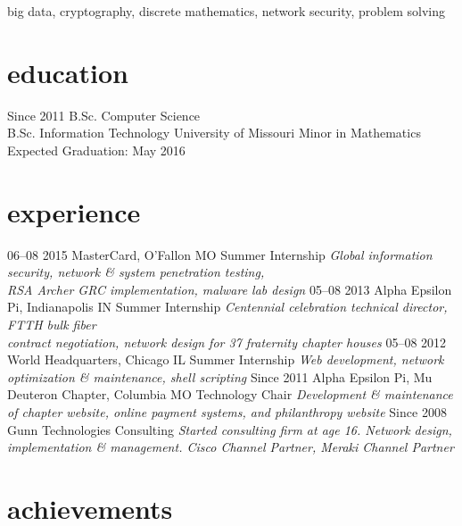 \documentclass[print]{gunn-resume}
\begin{document}
big data, cryptography, discrete mathematics, network security, problem solving
\section{education}

\begin{entrylist}
  \entry
    {Since 2011}
    {B.Sc. {\normalfont Computer Science}\\
    B.Sc. {\normalfont Information Technology}}
    {University of Missouri}
    {Minor in Mathematics\\
    Expected Graduation: May 2016}
\end{entrylist}

\section{experience}

\begin{entrylist}
 \entry
    {06–08 2015}
    {MasterCard, O'Fallon MO}
    {Summer Internship}
    {\emph{Global information security, network \& system penetration testing,\\RSA Archer GRC implementation, malware lab design}}
  \entry
    {05–08 2013}
    {Alpha Epsilon Pi, Indianapolis IN}
    {Summer Internship}
    {\emph{Centennial celebration technical director, FTTH bulk fiber\\ contract negotiation, network design for 37 fraternity chapter houses}}
  \entry
    {05–08 2012}
    {World Headquarters, Chicago IL}
    {Summer Internship}
    {\emph{Web development, network optimization \& maintenance, shell scripting}}
      \entry
    {Since 2011}
    {Alpha Epsilon Pi, Mu Deuteron Chapter, Columbia MO}
    {Technology Chair}
    {\emph{Development \& maintenance of chapter website, online payment systems, and philanthropy website}}
  \entry
    {Since 2008}
    {Gunn Technologies}
    {Consulting}
    {\emph{Started consulting firm at age 16. Network design, implementation \& management. Cisco Channel Partner, Meraki Channel Partner}}
\end{entrylist}

\section{achievements}
\end{document}
